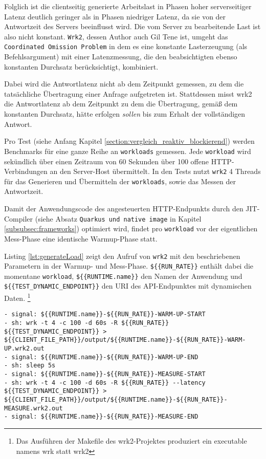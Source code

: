 Folglich ist die clientseitig generierte Arbeitslast in Phasen hoher serverseitiger Latenz deutlich geringer als in Phasen niedriger Latenz, da
sie von der Antwortzeit des Servers beeinflusst wird. Die vom Server zu bearbeitende Last ist also nicht konstant.\parencite{mci/Friedrich2017}
\newpage
\verb|Wrk2|, dessen Author auch Gil Tene ist, umgeht das \verb|Coordinated Omission Problem| in dem es eine konstante Lasterzeugung (als Befehlsargument) mit
einer Latenzmessung, die den beabsichtigten ebenso konstanten Durchsatz berücksichtigt, kombiniert.

Dabei wird die Antwortlatenz nicht ab dem Zeitpunkt gemessen, zu dem die tatsächliche Übertragung einer Anfrage aufgetreten ist.
Stattdessen misst wrk2 die Antwortlatenz ab dem Zeitpunkt zu dem die Übertragung,
gemäß dem konstanten Durchsatz, hätte erfolgen \textit{sollen} bis zum Erhalt der vollständigen Antwort.\parencite{Wrk2}\newline

Pro Test (siehe Anfang Kapitel \ref{section:vergleich_reaktiv_blockierend}) werden Benchmarks für eine ganze Reihe an \verb|workloads| gemessen.
Jede \verb|workload| wird sekündlich über einen Zeitraum von 60 Sekunden über 100 offene HTTP-Verbindungen an den Server-Host übermittelt.
In den Tests nutzt \verb|wrk2| 4 Threads für das Generieren und Übermitteln der \verb|workloads|, sowie das Messen der Antwortzeit.

Damit der Anwendungscode des angesteuerten HTTP-Endpunkts durch den JIT-Compiler (siehe Absatz \verb|Quarkus und native image| in Kapitel
\ref{subsubsec:frameworks}) optimiert wird, findet pro \verb|workload| vor der eigentlichen Mess-Phase eine identische Warmup-Phase statt.

Listing \ref*{lst:generateLoad} zeigt den Aufruf von \verb|wrk2| mit den beschriebenen Parametern in der Warmup- und Mess-Phase.
\verb|${{RUN_RATE}}| enthält dabei die momentane \verb|workload|, \verb|${{RUNTIME.name}}| den Namen der Anwendung und \verb|${{TEST_DYNAMIC_ENDPOINT}}| den
URI des API-Endpunktes mit dynamischen Daten.
\footnote{Das Ausführen der Makefile des wrk2-Projektes produziert ein executable namens wrk statt wrk2}

\begin{lstlisting}[caption=Auszug des qDup Skripts generate load, captionpos=b, label=lst:generateLoad]
- signal: ${{RUNTIME.name}}-${{RUN_RATE}}-WARM-UP-START
- sh: wrk -t 4 -c 100 -d 60s -R ${{RUN_RATE}} ${{TEST_DYNAMIC_ENDPOINT}} > ${{CLIENT_FILE_PATH}}/output/${{RUNTIME.name}}-${{RUN_RATE}}-WARM-UP.wrk2.out
- signal: ${{RUNTIME.name}}-${{RUN_RATE}}-WARM-UP-END
- sh: sleep 5s
- signal: ${{RUNTIME.name}}-${{RUN_RATE}}-MEASURE-START
- sh: wrk -t 4 -c 100 -d 60s -R ${{RUN_RATE}} --latency ${{TEST_DYNAMIC_ENDPOINT}} > ${{CLIENT_FILE_PATH}}/output/${{RUNTIME.name}}-${{RUN_RATE}}-MEASURE.wrk2.out
- signal: ${{RUNTIME.name}}-${{RUN_RATE}}-MEASURE-END
   \end{lstlisting}

